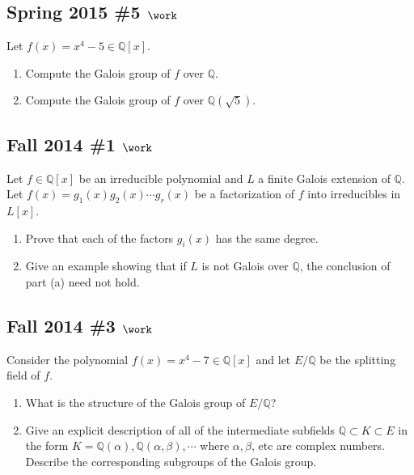 \hypertarget{spring-2015-5-work}{%
\subsection{\texorpdfstring{Spring 2015 \#5
\(\work\)}{Spring 2015 \#5 \textbackslash work}}\label{spring-2015-5-work}}

Let \(f(x) = x^4 - 5 \in {\mathbb{Q}}[x]\).

\begin{enumerate}
\def\labelenumi{\alph{enumi}.}
\item
  Compute the Galois group of \(f\) over \({\mathbb{Q}}\).
\item
  Compute the Galois group of \(f\) over \({\mathbb{Q}}(\sqrt{5})\).
\end{enumerate}

\hypertarget{fall-2014-1-work}{%
\subsection{\texorpdfstring{Fall 2014 \#1
\(\work\)}{Fall 2014 \#1 \textbackslash work}}\label{fall-2014-1-work}}

Let \(f\in {\mathbb{Q}}[x]\) be an irreducible polynomial and \(L\) a
finite Galois extension of \({\mathbb{Q}}\). Let
\(f(x) = g_1(x)g_2(x)\cdots g_r(x)\) be a factorization of \(f\) into
irreducibles in \(L[x]\).

\begin{enumerate}
\def\labelenumi{\alph{enumi}.}
\item
  Prove that each of the factors \(g_i(x)\) has the same degree.
\item
  Give an example showing that if \(L\) is not Galois over
  \({\mathbb{Q}}\), the conclusion of part (a) need not hold.
\end{enumerate}

\hypertarget{fall-2014-3-work}{%
\subsection{\texorpdfstring{Fall 2014 \#3
\(\work\)}{Fall 2014 \#3 \textbackslash work}}\label{fall-2014-3-work}}

Consider the polynomial \(f(x) = x^4 - 7 \in {\mathbb{Q}}[x]\) and let
\(E/{\mathbb{Q}}\) be the splitting field of \(f\).

\begin{enumerate}
\def\labelenumi{\alph{enumi}.}
\item
  What is the structure of the Galois group of \(E/{\mathbb{Q}}\)?
\item
  Give an explicit description of all of the intermediate subfields
  \({\mathbb{Q}}\subset K \subset E\) in the form
  \(K = {\mathbb{Q}}(\alpha), {\mathbb{Q}}(\alpha, \beta), \cdots\)
  where \(\alpha, \beta\), etc are complex numbers. Describe the
  corresponding subgroups of the Galois group.
\end{enumerate}

